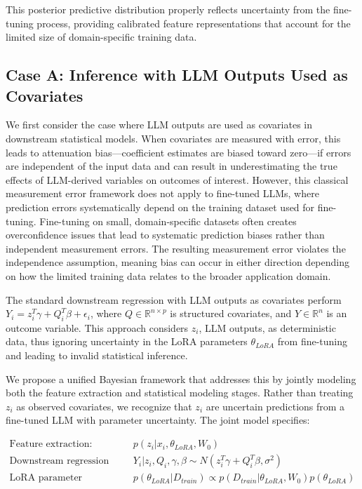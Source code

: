 \documentclass[11pt]{article}
\begin{document}
This posterior predictive distribution properly reflects uncertainty from the fine-tuning process, providing calibrated feature representations that account for the limited size of domain-specific training data.

\subsection{Case A: Inference with LLM Outputs Used as Covariates}

We first consider the case where LLM outputs are used as covariates in downstream statistical models. When covariates are measured with error, this leads to attenuation bias—coefficient estimates are biased toward zero—if errors are independent of the input data and can result in underestimating the true effects of LLM-derived variables on outcomes of interest. However, this classical measurement error framework does not apply to fine-tuned LLMs, where prediction errors systematically depend on the training dataset used for fine-tuning. Fine-tuning on small, domain-specific datasets often creates overconfidence issues that lead to systematic prediction biases rather than independent measurement errors. The resulting measurement error violates the independence assumption, meaning bias can occur in either direction depending on how the limited training data relates to the broader application domain.

The standard downstream regression with LLM outputs as covariates perform $Y_i = z_i^T\gamma + Q_i^T\beta + \epsilon_i$, where $Q \in \mathbb{R}^{n \times p}$ is structured covariates, and $Y \in \mathbb{R}^n$ is an outcome variable. This approach considers $z_i$, LLM outputs, as deterministic data, thus ignoring uncertainty in the LoRA parameters $\theta_{LoRA}$ from fine-tuning and leading to invalid statistical inference.

We propose a unified Bayesian framework that addresses this by jointly modeling both the feature extraction and statistical modeling stages. Rather than treating $z_i$ as observed covariates, we recognize that $z_i$ are uncertain predictions from a fine-tuned LLM with parameter uncertainty. The joint model specifies:

\begin{align}
\text{Feature extraction:} \quad &p(z_i|x_i, \theta_{LoRA}, W_0) \label{eq:feature_extraction} \\
\text{Downstream regression model:} \quad &Y_i|z_i, Q_i, \gamma, \beta \sim N(z_i^T\gamma + Q_i^T\beta, \sigma^2) \label{eq:regression_model} \\
\text{LoRA parameter posterior:} \quad &p(\theta_{LoRA}|D_{train}) \propto p(D_{train}|\theta_{LoRA}, W_0)p(\theta_{LoRA}) \label{eq:lora_posterior}
\end{align}
\end{document}
